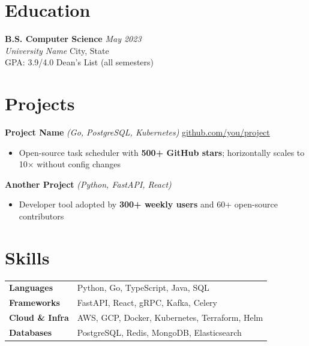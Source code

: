 \documentclass[11pt, a4paper]{article}
\begin{document}
\section{Education}

\textbf{B.S. Computer Science} \hfill \textit{May 2023} \\
\textit{\color{accent} University Name} \hfill {\small City, State} \\
GPA: 3.9/4.0 \quad Dean's List (all semesters)

\section{Projects}

\textbf{Project Name} \textit{(Go, PostgreSQL, Kubernetes)} \hfill \href{https://github.com/you/project}{\small github.com/you/project}
\begin{itemize}[leftmargin=*, noitemsep, topsep=2pt]
  \item Open-source task scheduler with \textbf{500+ GitHub stars}; horizontally scales to 10× without config changes
\end{itemize}

\vspace{3pt}
\textbf{Another Project} \textit{(Python, FastAPI, React)}
\begin{itemize}[leftmargin=*, noitemsep, topsep=2pt]
  \item Developer tool adopted by \textbf{300+ weekly users} and 60+ open-source contributors
\end{itemize}

\section{Skills}

\begin{tabular}{@{}ll}
\textbf{Languages} & Python, Go, TypeScript, Java, SQL \\
\textbf{Frameworks} & FastAPI, React, gRPC, Kafka, Celery \\
\textbf{Cloud \& Infra} & AWS, GCP, Docker, Kubernetes, Terraform, Helm \\
\textbf{Databases} & PostgreSQL, Redis, MongoDB, Elasticsearch \\
\end{tabular}
\end{document}
